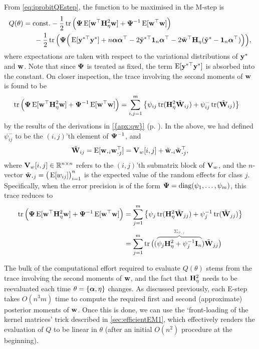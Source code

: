From \cref{eq:iprobitQEstep}, the function to be maximised in the M-step is
\begin{align*}
  Q(\theta) 
  &=\const -\half\tr\Big( \bPsi\E[\bw^\top\bH_\eta^2\bw]  + \bPsi^{-1} \E[\bw^\top\bw] \Big)   \\
  &\phantom{==} - \half \tr \Big( 
  \bPsi \Big( 
  \E[\by^{*\top}\by^*]
  + n \balpha\balpha^\top 
  - 2\tilde\by^{*\top}\bone_n \balpha^\top 
  - 2\tilde\bw^\top\bH_\eta (\tilde\by^* - \bone_n\balpha^\top) 
  \Big) \Big) %
  ,
\end{align*}
where expectations are taken with respect to the variational distributions of ${\mathbf y}^*$ and ${\mathbf w}$. 
Note that since ${\bm\Psi}$ is treated as fixed, the term $\operatorname{E}[{\mathbf y}^{*\top}{\mathbf y}^*]$ is absorbed into the constant.
On closer inspection, the trace involving the second moments of ${\mathbf w}$ is found to be
\begin{align*}
  \operatorname{tr} \Big( {\bm\Psi}\operatorname{E}[{\mathbf w}^\top{\mathbf H}_\eta^2{\mathbf w}]  + {\bm\Psi}^{-1} \operatorname{E}[{\mathbf w}^\top{\mathbf w}] \Big)
  &= \sum_{i,j=1}^m \left\{ \psi_{ij} \operatorname{tr}({\mathbf H}_\eta^2\tilde{{\mathbf W}}_{ij}) + \psi_{ij}^- \operatorname{tr}(\tilde{{\mathbf W}}_{ij}) \right\}
\end{align*}
by the results of the derivations in \cref{{apx:qw}} (p. \pageref{eq:trCEwDw}).
In the above, we had defined $\psi_{ij}^-$ to be the $(i,j)$'th element of ${\bm\Psi}^{-1}$, and
\[
  \tilde\bW_{ij} 
  = \E[\bw_{\bigcdot i}\bw_{\bigcdot j}^\top]
  =  \bV_{w}[i,j] + \tilde\bw_{\bigcdot i} \tilde\bw_{\bigcdot j}^\top,
\]
where ${\mathbf V}_{w}[i,j] \in \mathbb{R}^{n\times n}$ refers to the $(i,j)$'th submatrix block of ${\mathbf V}_w$, and the $n$-vector $\tilde \bw_{\bigcdot j} = \big(\E [w_{ij}] \big)_{i=1}^n$ is the expected value of the random effects for class $j$.
Specifically, when the error precision is of the form ${\bm\Psi} = \operatorname{diag}(\psi_1,\dots,\psi_m)$, this trace reduces to
\begin{align*}
  \tr \Big( \bPsi\E[\bw^\top\bH_\eta^2\bw]  + \bPsi^{-1} \E[\bw^\top\bw] \Big)
  &= \sum_{j=1}^m \left\{ \psi_j \tr(\bH_\eta^2\tilde\bW_{jj}) + \psi_j^{-1} \tr(\tilde\bW_{jj}) \right\} \\
  &= \sum_{j=1}^m \tr\big( 
  (\greyoverbrace{\psi_j\bH_\eta^2 + \psi_j^{-1}\bI_n}{\bSigma_{\theta,j}}) 
  \tilde\bW_{jj} \big)
\end{align*}

The bulk of the computational effort required to evaluate $Q(\theta)$ stems from the trace involving the second moments of ${\mathbf w}$, and the fact that ${\mathbf H}_\eta^2$ needs to be reevaluated each time $\theta = \{{\bm\alpha},\eta\}$ changes.
As discussed previously, each E-step takes $O(n^3m)$ time to compute the required first and second (approximate) posterior moments of ${\mathbf w}$.
Once this is done, we can use the `front-loading of the kernel matrices' trick described in \cref{sec:efficientEM1}, which effectively renders the evaluation of $Q$ to be linear in $\theta$ (after an initial $O(n^2)$ procedure at the beginning).

